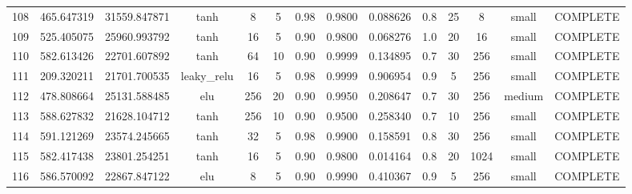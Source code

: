 \begin{longtable}{cccccccccccccc}
                      108 &                 465.647319 &                       31559.847871 &            tanh &           8 &              5 &        0.98 & 0.9800 &       0.088626 &             0.8 &                 25 &        8 &     small & COMPLETE \\
                      109 &                 525.405075 &                       25960.993792 &            tanh &          16 &              5 &        0.90 & 0.9800 &       0.068276 &             1.0 &                 20 &       16 &     small & COMPLETE \\
                      110 &                 582.613426 &                       22701.607892 &            tanh &          64 &             10 &        0.90 & 0.9999 &       0.134895 &             0.7 &                 30 &      256 &     small & COMPLETE \\
                      111 &                 209.320211 &                       21701.700535 &     leaky\_relu &          16 &              5 &        0.98 & 0.9999 &       0.906954 &             0.9 &                  5 &      256 &     small & COMPLETE \\
                      112 &                 478.808664 &                       25131.588485 &             elu &         256 &             20 &        0.90 & 0.9950 &       0.208647 &             0.7 &                 30 &      256 &    medium & COMPLETE \\
                      113 &                 588.627832 &                       21628.104712 &            tanh &         256 &             10 &        0.90 & 0.9500 &       0.258340 &             0.7 &                 10 &      256 &     small & COMPLETE \\
                      114 &                 591.121269 &                       23574.245665 &            tanh &          32 &              5 &        0.98 & 0.9900 &       0.158591 &             0.8 &                 30 &      256 &     small & COMPLETE \\
                      115 &                 582.417438 &                       23801.254251 &            tanh &          16 &              5 &        0.90 & 0.9800 &       0.014164 &             0.8 &                 20 &     1024 &     small & COMPLETE \\
                      116 &                 586.570092 &                       22867.847122 &             elu &           8 &              5 &        0.90 & 0.9990 &       0.410367 &             0.9 &                  5 &      256 &     small & COMPLETE \\

\end{longtable}
